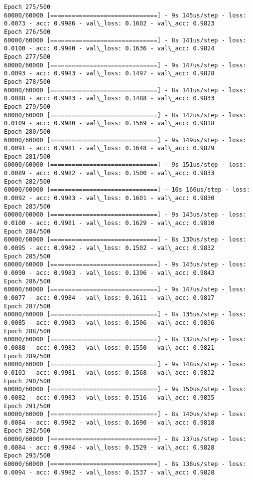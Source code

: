 \documentclass[11pt]{article}
\begin{document}
\begin{Verbatim}[commandchars=\\\{\}]
Epoch 275/500
60000/60000 [==============================] - 9s 145us/step - loss: 0.0073 - acc: 0.9986 - val\_loss: 0.1602 - val\_acc: 0.9823
Epoch 276/500
60000/60000 [==============================] - 8s 141us/step - loss: 0.0100 - acc: 0.9980 - val\_loss: 0.1636 - val\_acc: 0.9824
Epoch 277/500
60000/60000 [==============================] - 9s 147us/step - loss: 0.0093 - acc: 0.9983 - val\_loss: 0.1497 - val\_acc: 0.9828
Epoch 278/500
60000/60000 [==============================] - 8s 141us/step - loss: 0.0088 - acc: 0.9983 - val\_loss: 0.1488 - val\_acc: 0.9833
Epoch 279/500
60000/60000 [==============================] - 8s 142us/step - loss: 0.0109 - acc: 0.9980 - val\_loss: 0.1569 - val\_acc: 0.9818
Epoch 280/500
60000/60000 [==============================] - 9s 149us/step - loss: 0.0091 - acc: 0.9981 - val\_loss: 0.1648 - val\_acc: 0.9829
Epoch 281/500
60000/60000 [==============================] - 9s 151us/step - loss: 0.0089 - acc: 0.9982 - val\_loss: 0.1500 - val\_acc: 0.9833
Epoch 282/500
60000/60000 [==============================] - 10s 166us/step - loss: 0.0092 - acc: 0.9983 - val\_loss: 0.1601 - val\_acc: 0.9830
Epoch 283/500
60000/60000 [==============================] - 9s 143us/step - loss: 0.0100 - acc: 0.9981 - val\_loss: 0.1629 - val\_acc: 0.9810
Epoch 284/500
60000/60000 [==============================] - 8s 130us/step - loss: 0.0095 - acc: 0.9982 - val\_loss: 0.1502 - val\_acc: 0.9832
Epoch 285/500
60000/60000 [==============================] - 9s 143us/step - loss: 0.0090 - acc: 0.9983 - val\_loss: 0.1396 - val\_acc: 0.9843
Epoch 286/500
60000/60000 [==============================] - 9s 147us/step - loss: 0.0077 - acc: 0.9984 - val\_loss: 0.1611 - val\_acc: 0.9817
Epoch 287/500
60000/60000 [==============================] - 8s 135us/step - loss: 0.0085 - acc: 0.9983 - val\_loss: 0.1506 - val\_acc: 0.9836
Epoch 288/500
60000/60000 [==============================] - 8s 132us/step - loss: 0.0088 - acc: 0.9983 - val\_loss: 0.1550 - val\_acc: 0.9821
Epoch 289/500
60000/60000 [==============================] - 9s 148us/step - loss: 0.0103 - acc: 0.9981 - val\_loss: 0.1568 - val\_acc: 0.9832
Epoch 290/500
60000/60000 [==============================] - 9s 150us/step - loss: 0.0082 - acc: 0.9983 - val\_loss: 0.1516 - val\_acc: 0.9835
Epoch 291/500
60000/60000 [==============================] - 8s 140us/step - loss: 0.0084 - acc: 0.9982 - val\_loss: 0.1690 - val\_acc: 0.9818
Epoch 292/500
60000/60000 [==============================] - 8s 137us/step - loss: 0.0084 - acc: 0.9984 - val\_loss: 0.1529 - val\_acc: 0.9828
Epoch 293/500
60000/60000 [==============================] - 8s 138us/step - loss: 0.0094 - acc: 0.9982 - val\_loss: 0.1537 - val\_acc: 0.9828

\end{Verbatim}
\end{document}
